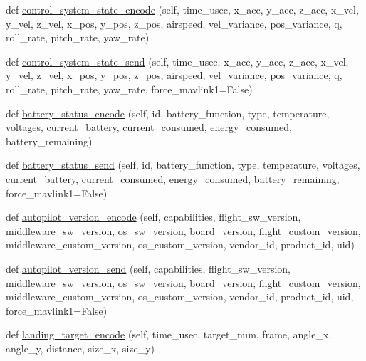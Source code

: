 \begin{DoxyCompactItemize}
\item 
def \hyperlink{classpymavlink_1_1dialects_1_1v10_1_1MAVLink_a6e357639b448f6318b92c15f5714ec38}{control\+\_\+system\+\_\+state\+\_\+encode} (self, time\+\_\+usec, x\+\_\+acc, y\+\_\+acc, z\+\_\+acc, x\+\_\+vel, y\+\_\+vel, z\+\_\+vel, x\+\_\+pos, y\+\_\+pos, z\+\_\+pos, airspeed, vel\+\_\+variance, pos\+\_\+variance, q, roll\+\_\+rate, pitch\+\_\+rate, yaw\+\_\+rate)
\item 
def \hyperlink{classpymavlink_1_1dialects_1_1v10_1_1MAVLink_adef926494a5a129dc1a81bcf701b486e}{control\+\_\+system\+\_\+state\+\_\+send} (self, time\+\_\+usec, x\+\_\+acc, y\+\_\+acc, z\+\_\+acc, x\+\_\+vel, y\+\_\+vel, z\+\_\+vel, x\+\_\+pos, y\+\_\+pos, z\+\_\+pos, airspeed, vel\+\_\+variance, pos\+\_\+variance, q, roll\+\_\+rate, pitch\+\_\+rate, yaw\+\_\+rate, force\+\_\+mavlink1=False)
\item 
def \hyperlink{classpymavlink_1_1dialects_1_1v10_1_1MAVLink_aad3718191198b6140e0cacb80b8b8749}{battery\+\_\+status\+\_\+encode} (self, id, battery\+\_\+function, type, temperature, voltages, current\+\_\+battery, current\+\_\+consumed, energy\+\_\+consumed, battery\+\_\+remaining)
\item 
def \hyperlink{classpymavlink_1_1dialects_1_1v10_1_1MAVLink_a5e24cb74a6c35aa9859ce52ca010381b}{battery\+\_\+status\+\_\+send} (self, id, battery\+\_\+function, type, temperature, voltages, current\+\_\+battery, current\+\_\+consumed, energy\+\_\+consumed, battery\+\_\+remaining, force\+\_\+mavlink1=False)
\item 
def \hyperlink{classpymavlink_1_1dialects_1_1v10_1_1MAVLink_a8f02f69e3e73c4f1af48910253344ed0}{autopilot\+\_\+version\+\_\+encode} (self, capabilities, flight\+\_\+sw\+\_\+version, middleware\+\_\+sw\+\_\+version, os\+\_\+sw\+\_\+version, board\+\_\+version, flight\+\_\+custom\+\_\+version, middleware\+\_\+custom\+\_\+version, os\+\_\+custom\+\_\+version, vendor\+\_\+id, product\+\_\+id, uid)
\item 
def \hyperlink{classpymavlink_1_1dialects_1_1v10_1_1MAVLink_a50bdc4178c7e18fb1f51740eda1978ac}{autopilot\+\_\+version\+\_\+send} (self, capabilities, flight\+\_\+sw\+\_\+version, middleware\+\_\+sw\+\_\+version, os\+\_\+sw\+\_\+version, board\+\_\+version, flight\+\_\+custom\+\_\+version, middleware\+\_\+custom\+\_\+version, os\+\_\+custom\+\_\+version, vendor\+\_\+id, product\+\_\+id, uid, force\+\_\+mavlink1=False)
\item 
def \hyperlink{classpymavlink_1_1dialects_1_1v10_1_1MAVLink_ad64fe6a2dca46c21166709c21820d080}{landing\+\_\+target\+\_\+encode} (self, time\+\_\+usec, target\+\_\+num, frame, angle\+\_\+x, angle\+\_\+y, distance, size\+\_\+x, size\+\_\+y)

\end{DoxyCompactItemize}
